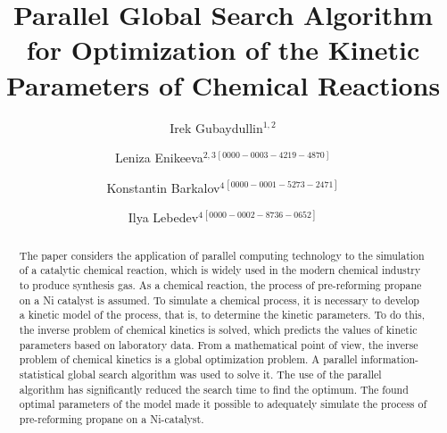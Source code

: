 \documentclass{svproc}
\def\orcidID#1{\unskip$^{[#1]}$}
\begin{document}
\mainmatter              %
%
\title{Parallel Global Search Algorithm for Optimization of the Kinetic Parameters of Chemical Reactions}
%
%
\author{
Irek Gubaydullin$^{1,2}$\and
Leniza Enikeeva$^{2,3}$\orcidID{0000-0003-4219-4870}
\and
Konstantin Barkalov$^4$\orcidID{0000-0001-5273-2471}
\and
Ilya Lebedev$^4$\orcidID{0000-0002-8736-0652} 
}

%
%
%


	
\maketitle              %

\begin{abstract}
The paper considers the application of parallel computing technology to the simulation of a catalytic chemical reaction, which is widely used in the modern chemical industry to produce synthesis gas. As a chemical reaction, the process of pre-reforming propane on a Ni catalyst is assumed. To simulate a chemical process, it is necessary to develop a kinetic model of the process, that is, to determine the kinetic parameters. To do this, the inverse problem of chemical kinetics is solved, which predicts the values of kinetic parameters based on laboratory data. From a mathematical point of view, the inverse problem of chemical kinetics is a global optimization problem. A parallel information-statistical global search algorithm was used to solve it. The use of the parallel algorithm has significantly reduced the search time to find the optimum. The found optimal parameters of the model made it possible to adequately simulate the process of pre-reforming propane on a Ni-catalyst.

\end{abstract}
\end{document}
